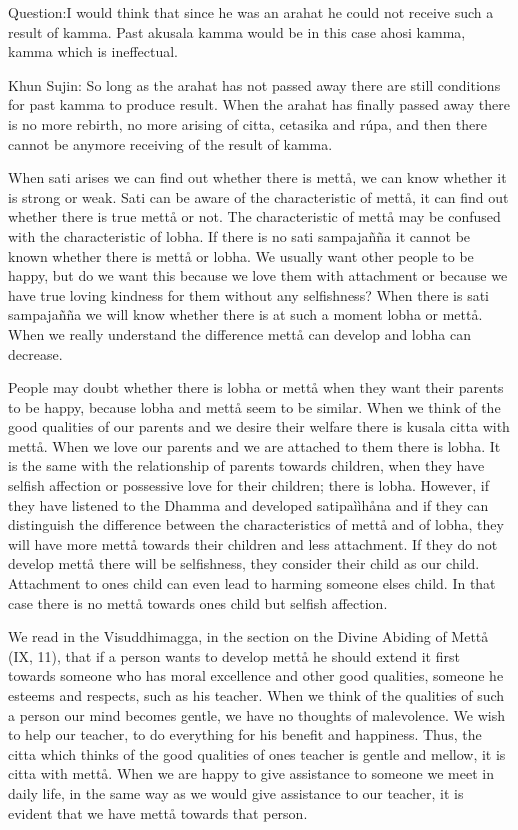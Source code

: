 \documentclass[12pt,twoside]{article}
\begin{document}
Question:I would think that since he was an arahat he could not receive
such a result of kamma. Past akusala kamma would be in this case
{\textasciigrave}{\textasciigrave}ahosi
kamma{\textquotesingle}{\textquotesingle}, kamma which is ineffectual. 

Khun Sujin: So long as the arahat has not passed away there are still
conditions for past kamma to produce result. When the arahat has
finally passed away there is no more rebirth, no more arising of citta,
cetasika and r\'upa, and then there cannot be anymore receiving of the
result of kamma. 

When sati arises we can find out whether there is mett{\aa}, we can know
whether it is strong or weak. Sati can be aware of the characteristic
of mett{\aa}, it can find out whether there is true mett{\aa} or not.
The characteristic of mett{\aa} may be confused with the characteristic
of lobha. If there is no sati sampaja\~n\~na it cannot be known whether
there is mett{\aa} or lobha. We usually want other people to be happy,
but do we want this because we love them with attachment or because we
have true loving kindness for them without any selfishness? When there
is sati sampaja\~n\~na we will know whether there is at such a moment
lobha or mett{\aa}. When we really understand the difference mett{\aa}
can develop and lobha can decrease. 

People may doubt whether there is lobha or mett{\aa} when they want
their parents to be happy, because lobha and mett{\aa} seem to be
similar. When we think of the good qualities of our parents and we
desire their welfare there is kusala citta with mett{\aa}. When we love
our parents and we are attached to them there is lobha. It is the same
with the relationship of parents towards children, when they have
selfish affection or possessive love for their children; there is
lobha. However, if they have listened to the Dhamma and developed
satipa\`i\`ih{\aa}na and if they can distinguish the difference between
the characteristics of mett{\aa} and of lobha, they will have more
mett{\aa} towards their children and less attachment. If they do not
develop mett{\aa} there will be selfishness, they consider their child
as {\textasciigrave}{\textasciigrave}our
child{\textquotesingle}{\textquotesingle}. Attachment to
one{\textquotesingle}s child can even lead to harming someone
else{\textquotesingle}s child. In that case there is no mett{\aa}
towards one{\textquotesingle}s child but selfish affection. 

We read in the Visuddhimagga, in the section on the Divine Abiding of
Mett{\aa} (IX, 11), that if a person wants to develop mett{\aa} he
should extend it first towards someone who has moral excellence and
other good qualities, someone he esteems and respects, such as his
teacher. When we think of the qualities of such a person our mind
becomes gentle, we have no thoughts of malevolence. We wish to help our
teacher, to do everything for his benefit and happiness. Thus, the
citta which thinks of the good qualities of one{\textquotesingle}s
teacher is gentle and mellow, it is citta with mett{\aa}. When we are
happy to give assistance to someone we meet in daily life, in the same
way as we would give assistance to our teacher, it is evident that we
have mett{\aa} towards that person. 
\end{document}

